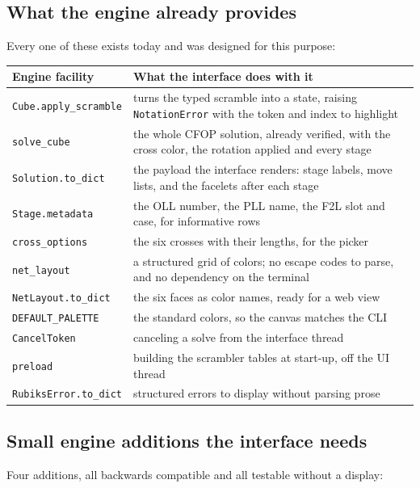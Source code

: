 \subsection{What the engine already provides}

Every one of these exists today and was designed for this purpose:

\begin{longtable}{@{}p{4.8cm}p{9.4cm}@{}}
\toprule
Engine facility & What the interface does with it \\
\midrule
\endhead
\texttt{Cube.apply\_scramble} & turns the typed scramble into a state, raising
\texttt{NotationError} with the token and index to highlight \\
\texttt{solve\_cube} & the whole CFOP solution, already verified, with the cross
color, the rotation applied and every stage \\
\texttt{Solution.to\_dict} & the payload the interface renders: stage labels, move
lists, and the facelets after each stage \\
\texttt{Stage.metadata} & the OLL number, the PLL name, the F2L slot and case, for
informative rows \\
\texttt{cross\_options} & the six crosses with their lengths, for the picker \\
\texttt{net\_layout} & a structured grid of colors; no escape codes to parse, and
no dependency on the terminal \\
\texttt{NetLayout.to\_dict} & the six faces as color names, ready for a web view \\
\texttt{DEFAULT\_PALETTE} & the standard colors, so the canvas matches the CLI \\
\texttt{CancelToken} & canceling a solve from the interface thread \\
\texttt{preload} & building the scrambler tables at start-up, off the UI thread \\
\texttt{RubiksError.to\_dict} & structured errors to display without parsing prose \\
\bottomrule
\end{longtable}

\subsection{Small engine additions the interface needs}

Four additions, all backwards compatible and all testable without a display:

